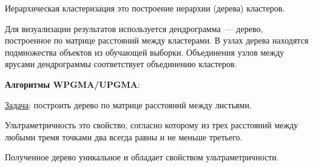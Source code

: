 
\begin{definition}
  Иерархическая кластеризация это построение иерархии (дерева) кластеров.
\end{definition}

Для визуализации результатов используется дендрограмма~--- дерево, построенное
по матрице расстояний между кластерами. В узлах дерева находятся подмножества
объектов из обучающей выборки. Объединения узлов между ярусами дендрограммы
соответствует объединению кластеров.

\textbf{Алгоритмы WPGMA/UPGMA}:

\underline{Задача}: построить дерево по матрице расстояний между листьями.

\begin{definition}
  Ультраметричность это свойство, согласно которому из трех расстояний между
  любыми тремя точками два всегда равны и не меньше третьего.
\end{definition}

\begin{remark}
  Полученное дерево уникальное и обладает свойством ультраметричности.
\end{remark}

